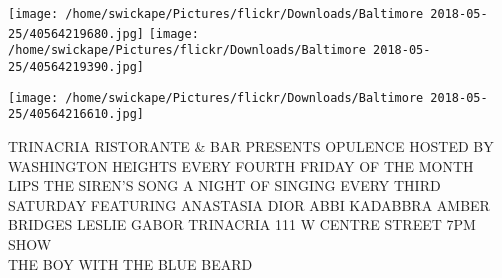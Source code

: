 \documentclass[10pt,letterpaper]{article}
\begin{document}
\texttt{[image: /home/swickape/Pictures/flickr/Downloads/Baltimore 2018-05-25/40564219680.jpg]}
\texttt{[image: /home/swickape/Pictures/flickr/Downloads/Baltimore 2018-05-25/40564219390.jpg]}

\texttt{[image: /home/swickape/Pictures/flickr/Downloads/Baltimore 2018-05-25/40564216610.jpg]}

TRINACRIA RISTORANTE \& BAR PRESENTS OPULENCE HOSTED BY WASHINGTON HEIGHTS EVERY FOURTH FRIDAY OF THE MONTH\\
LIPS THE SIREN'S SONG A NIGHT OF SINGING EVERY THIRD SATURDAY FEATURING ANASTASIA DIOR ABBI KADABBRA AMBER BRIDGES LESLIE GABOR TRINACRIA 111 W CENTRE STREET 7PM SHOW\\
THE BOY WITH THE BLUE BEARD
\pagebreak
\end{document}
